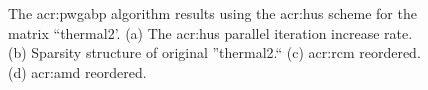 \begin{figure}
	\centerline{
	}
	\centerline{
	\hfil
	\hfil
	}
	\caption[The \acrshort{acr:pwgabp} algorithm results using the \acrshort{acr:hus} scheme.]{The \gls{acr:pwgabp} algorithm results using the \gls{acr:hus} scheme for the matrix ``thermal2'. (a) The \gls{acr:hus} parallel iteration increase rate. (b) Sparsity structure of original ''thermal2.`` (c) \gls{acr:rcm} reordered. (d) \gls{acr:amd} reordered.}
	\label{fig:hu-gabp}
\end{figure}


